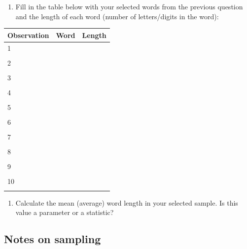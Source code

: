 \documentclass[
]{report}
\providecommand{\tightlist}{%
  \setlength{\itemsep}{0pt}\setlength{\parskip}{0pt}}
\begin{document}
\vspace{0.3in}

\begin{enumerate}
\def\labelenumi{\arabic{enumi}.}
\setcounter{enumi}{1}
\tightlist
\item
  Fill in the table below with your selected words from the previous question and the length of each word (number of letters/digits in the word):
  \vspace{1mm}
\end{enumerate}

\begin{center}
\begin{tabular}{|l|p{3in}|p{1in}|} \hline
Observation & Word & Length  \\ \hline
1 & & \\ 
& & \\ \hline
2 & & \\ 
& & \\ \hline
3 & & \\ 
& & \\ \hline
4 & & \\ 
& & \\ \hline
5 & & \\ 
& & \\ \hline
6 & & \\ 
& & \\ \hline
7 & & \\
& & \\ \hline
8 & & \\ 
& & \\ \hline
9 & & \\ 
& & \\ \hline
10 & & \\ 
& & \\ \hline
\end{tabular}
\end{center}

\begin{enumerate}
\def\labelenumi{\arabic{enumi}.}
\setcounter{enumi}{2}
\tightlist
\item
  Calculate the mean (average) word length in your selected sample. Is this value a parameter or a statistic?\\
  \vspace{0.3in}
\end{enumerate}

\subsection*{Notes on sampling}\label{notes-on-sampling}
\end{document}
